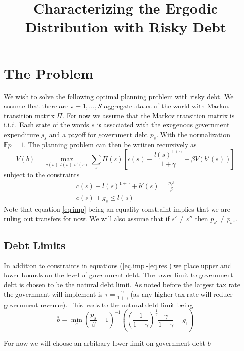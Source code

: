 \documentclass[12pt]{article}
\title{Characterizing the Ergodic Distribution with Risky Debt}
\date{}
\newcommand{\EE}{\mathbb E}
\begin{document}
\maketitle
\section{The Problem}
We wish to solve the following optimal planning problem with risky debt.  We assume that there are $s = 1,\ldots,S$ aggregate states of the world with Markov transition matrix $\Pi$.  For now we assume that the Markov transition matrix is i.i.d.  Each state of the words $s$ is associated with the exogenous government expenditure $g_s$ and a payoff for government debt $p_s$.  With the normalization $\EE p = 1$.  The planning problem can then be written recursively as 
\[
	V(b) = \max_{c(s),l(s),b'(s)}\sum_s \Pi(s)\left[ c(s) - \frac{l(s)^{1+\gamma}}{1+\gamma}+ \beta V(b'(s)) \right]
\]subject to the constraints
\begin{subequations}
\begin{align}\label{eq.imp}
	c(s) - l(s)^{1+\gamma}  + b'(s)  = \frac{p_s b}{\beta}\\
	c(s) + g_s  \leq l(s)\label{eq.res}
\end{align}
\end{subequations} Note that equation \eqref{eq.imp} being an equality constraint implies that we are ruling out transfers for now.  We will also assume that if $s'\neq s''$ then $p_{s'}\neq p_{s''}$.
\subsection{Debt Limits}
In addition to constraints in equations (\ref{eq.imp}-\ref{eq.res}) we place upper and lower bounds on the level of government debt.  The lower limit to government debt is chosen to be the natural debt limit.  As noted before the largest tax rate the government will implement is $\tau = \frac{\gamma}{1+\gamma}$ (as any higher tax rate will reduce government revenue).  This leads to the natural debt limit being 
\begin{equation}
	\overline b = \min_{s}\left(\frac{p_s}{\beta}-1\right)^{-1}\left(\left(\frac1{1+\gamma}\right)^\frac1\gamma\frac\gamma{1+\gamma} - g_s\right)
\end{equation}

For now we will choose an arbitrary lower limit on government debt $\underline b$
\end{document}
